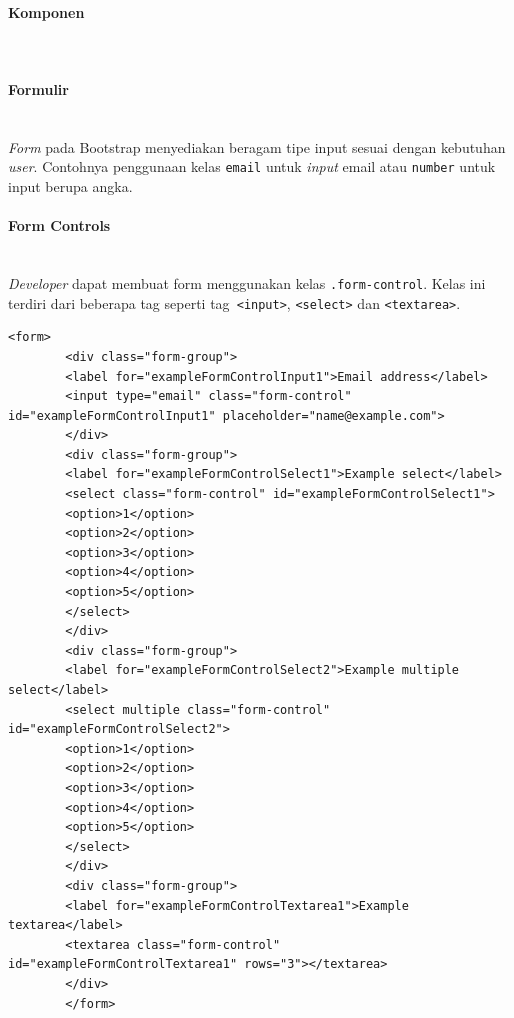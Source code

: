 \documentclass[a4paper,twoside]{article}
\newcommand{\myparagraph}[1]{\paragraph{#1}\mbox{}\\}
\begin{document}
\begin{enumerate}
		
		
		\myparagraph{Komponen}
		\myparagraph{Formulir}
		\textit{Form} pada Bootstrap menyediakan beragam tipe input sesuai dengan kebutuhan \textit{user}. Contohnya penggunaan kelas \texttt{email} untuk \textit{input} email atau \texttt{number} untuk input berupa angka.
		\myparagraph{Form Controls}
		\textit{Developer} dapat membuat form menggunakan kelas \colorbox{mygray}{\texttt{.form-control}}. Kelas ini terdiri dari beberapa tag seperti tag\colorbox{mygray}{\texttt{ <input>}}, \colorbox{mygray}{\texttt{<select>}} dan \colorbox{mygray}{\texttt{<textarea>}}.
		\begin{lstlisting}[frame=single, basicstyle=\tiny] 
		<form>
		<div class="form-group">
		<label for="exampleFormControlInput1">Email address</label>
		<input type="email" class="form-control" id="exampleFormControlInput1" placeholder="name@example.com">
		</div>
		<div class="form-group">
		<label for="exampleFormControlSelect1">Example select</label>
		<select class="form-control" id="exampleFormControlSelect1">
		<option>1</option>
		<option>2</option>
		<option>3</option>
		<option>4</option>
		<option>5</option>
		</select>
		</div>
		<div class="form-group">
		<label for="exampleFormControlSelect2">Example multiple select</label>
		<select multiple class="form-control" id="exampleFormControlSelect2">
		<option>1</option>
		<option>2</option>
		<option>3</option>
		<option>4</option>
		<option>5</option>
		</select>
		</div>
		<div class="form-group">
		<label for="exampleFormControlTextarea1">Example textarea</label>
		<textarea class="form-control" id="exampleFormControlTextarea1" rows="3"></textarea>
		</div>
		</form>
		\end{lstlisting}
		

\end{enumerate}
\end{document}
